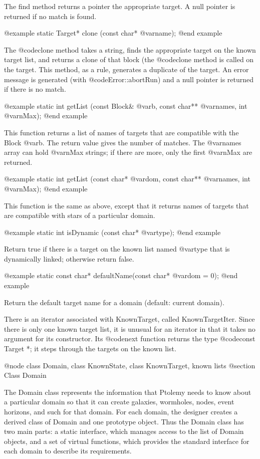 The find method returns a pointer the appropriate target.
A null pointer is returned if no match
is found.

@example
static Target* clone (const char* @var{name});
@end example

The @code{clone} method takes a string, finds the appropriate target on
the known target list, and returns a clone of that block (the
@code{clone} method is called on the target.  This method, as
a rule, generates a duplicate of the target.
An error message is generated (with @code{Error::abortRun}) and
a null pointer is returned if there is no match.

@example
static int getList (const Block& @var{b}, const char** @var{names}, int @var{nMax});
@end example

This function returns a list of names of targets that are compatible
with the Block @var{b}.  The return value gives the number of matches.
The @var{names} array can hold @var{nMax} strings; if there are more,
only the first @var{nMax} are returned.

@example
static int getList (const char* @var{dom}, const char** @var{names}, int @var{nMax});
@end example

This function is the same as above, except that it returns names of
targets that are compatible with stars of a particular domain.

@example
static int isDynamic (const char* @var{type});
@end example

Return true if there is a target on the known list named @var{type}
that is dynamically linked; otherwise return false.

@example
static const char* defaultName(const char* @var{dom} = 0);
@end example

Return the default target name for a domain (default: current domain).

There is an iterator associated with KnownTarget, called
KnownTargetIter.  Since there is only one known target list, it is
unusual for an iterator in that it takes no argument for its constructor.
Its @code{next} function returns the type @code{const Target *}; it
steps through the targets on the known list.

@node class Domain, class KnownState, class KnownTarget, known lists
@section Class Domain

The Domain class represents the information that Ptolemy needs to know
about a particular domain so that it can create galaxies, wormholes,
nodes, event horizons, and such for that domain.  For each domain,
the designer creates a derived class of Domain and one prototype object.
Thus the Domain class has two main parts: a static interface, which
manages access to the list of Domain objects, and a set of virtual
functions, which provides the standard interface for each domain to
describe its requirements.

